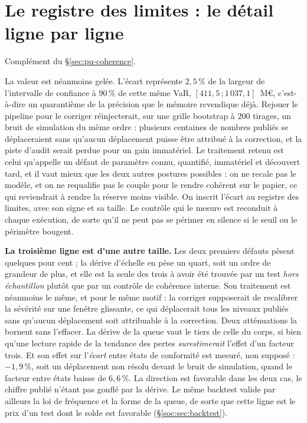 \section{Le registre des limites : le détail ligne par ligne}
\label{sec:ann-registre-limites}


Complément du \S\ref{sec:pu-coherence}.

La valeur est néanmoins gelée. L'écart représente $2{,}5\,\%$ de la largeur de l'intervalle de
confiance à $90\,\%$ de cette même VaR, $[411{,}5\,;1\,037{,}1]$~M\euro, c'est-à-dire un
quarantième de la précision que le mémoire revendique déjà. Rejouer le pipeline pour le corriger
réinjecterait, sur une grille bootstrap à $200$ tirages, un bruit de simulation du même ordre :
plusieurs centaines de nombres publiés se déplaceraient sans qu'aucun déplacement puisse être
attribué à la correction, et la piste d'audit serait perdue pour un gain immatériel. Le
traitement retenu est celui qu'appelle un défaut de paramètre connu, quantifié, immatériel et
découvert tard, et il vaut mieux que les deux autres postures possibles : on ne recale pas le
modèle, et on ne requalifie pas le couple pour le rendre cohérent sur le papier, ce qui
reviendrait à rendre la réserve moins visible. On inscrit l'écart au registre des limites, avec
son signe et sa taille. Le contrôle qui le mesure est reconduit à chaque exécution, de sorte
qu'il ne peut pas se périmer en silence si le seuil ou le périmètre bougent.

\vspace{2pt}
\noindent \textbf{La troisième ligne est d'une autre taille.} Les deux
premiers défauts pèsent quelques pour cent ; la dérive d'échelle en pèse un quart, soit un ordre
de grandeur de plus, et elle est la seule des trois à avoir été trouvée par un test
\emph{hors échantillon} plutôt que par un contrôle de cohérence interne. Son traitement est
néanmoins le même, et pour le même motif : la corriger supposerait de recalibrer la sévérité sur
une fenêtre glissante, ce qui déplacerait tous les niveaux publiés sans qu'aucun déplacement soit
attribuable à la correction. Deux atténuations la bornent sans l'effacer. La dérive de la queue
vaut le tiers de celle du corps, si bien qu'une lecture rapide de la tendance des pertes
\emph{surestimerait} l'effet d'un facteur trois. Et son effet sur l'\emph{écart} entre états de
conformité est mesuré, non supposé : $-1{,}9\,\%$, soit un déplacement non résolu devant le bruit
de simulation, quand le facteur entre états baisse de $6{,}6\,\%$. La direction est favorable
dans les deux cas, le chiffre publié n'étant pas gonflé par la dérive. Le même backtest valide
par ailleurs la loi de fréquence et la forme de la queue, de sorte que cette ligne est le prix
d'un test dont le solde est favorable (\S\ref{soc:sec:backtest}).

